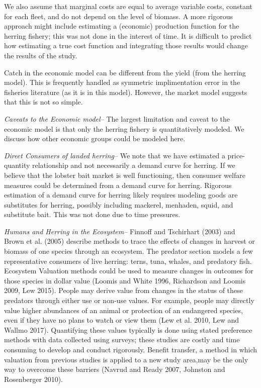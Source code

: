 \documentclass[]{article}
\begin{document}
We also assume that marginal costs are equal to average variable costs,
constant for each fleet, and do not depend on the level of biomass. A
more rigorous approach might include estimating a (economic) production
function for the herring fishery; this was not done in the interest of
time. It is difficult to predict how estimating a true cost function and
integrating those results would change the results of the study.

Catch in the economic model can be different from the yield (from the
herring model). This is frequently handled as symmetric implimentation
error in the fisheries literature (as it is in this model). However, the
market model suggests that this is not so simple.

\emph{Caveats to the Economic model--} The largest limitation and caveat
to the economic model is that only the herring fishery is quantitatively
modeled. We discuss how other economic groups could be modeled here.

\emph{Direct Consumers of landed herring--} We note that we have
estimated a price-quantity relationship and not necessarily a demand
curve for herring. If we believe that the lobster bait market is well
functioning, then consumer welfare measures could be determined from a
demand curve for herring. Rigorous estimation of a demand curve for
herring likely requires modeling goods are substitutes for herring,
possibly including mackerel, menhaden, squid, and substitute bait. This
was not done due to time pressures.

\emph{Humans and Herring in the Ecosystem--} Finnoff and Tschirhart
(2003) and Brown et al. (2005) describe methods to trace the effects of
changes in harvest or biomass of one species through an ecosystem. The
predator section models a few representative consumers of live herring:
terns, tuna, whales, and predatory fish. Ecosystem Valuation methods
could be used to measure changes in outcomes for those species in dollar
value (Loomis and White 1996, Richardson and Loomis 2009, Lew 2015).
People may derive value from changes in the status of these predators
through either use or non-use values. For example, people may directly
value higher abundances of an animal or protection of an endangered
species, even if they have no plans to watch or view them (Lew et al.
2010, Lew and Wallmo 2017). Quantifying these values typically is done
using stated preference methods with data collected using surveys; these
studies are costly and time consuming to develop and conduct rigorously.
Benefit transfer, a method in which valuation from previous studies is
applied to a new study area,may be the only way to overcome these
barriers (Navrud and Ready 2007, Johnston and Rosenberger 2010).
\end{document}
